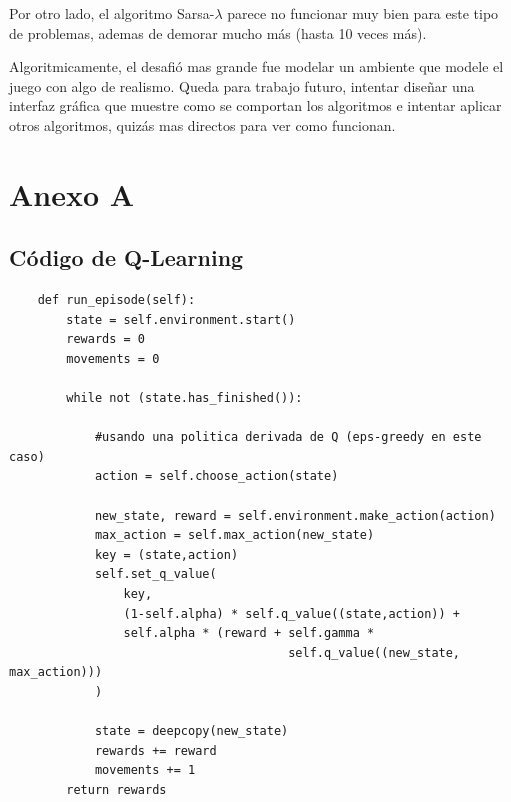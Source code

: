 \documentclass[11pt, a4paper]{article}
\newcommand{\slambda}{Sarsa-$\lambda$ }
\begin{document}
Por otro lado, el algoritmo \slambda parece no funcionar muy bien para este tipo de problemas, ademas de demorar mucho m\'as (hasta 10 veces m\'as). 

Algoritmicamente, el desafi\'o mas grande fue modelar un ambiente que modele el juego con algo de realismo. Queda para trabajo futuro, intentar diseñar una interfaz gr\'afica que muestre como se comportan los algoritmos e intentar aplicar otros algoritmos, quiz\'as mas directos para ver como funcionan. 



\newpage

\section{Anexo A}
\subsection{Código de Q-Learning}
\begin{verbatim}
    def run_episode(self):
        state = self.environment.start()
        rewards = 0
        movements = 0
        
        while not (state.has_finished()):
            
            #usando una politica derivada de Q (eps-greedy en este caso)
            action = self.choose_action(state)
            
            new_state, reward = self.environment.make_action(action)
            max_action = self.max_action(new_state)
            key = (state,action)
            self.set_q_value(
                key, 
                (1-self.alpha) * self.q_value((state,action)) + 
                self.alpha * (reward + self.gamma * 
                                       self.q_value((new_state, max_action)))
            )
            
            state = deepcopy(new_state)
            rewards += reward
            movements += 1
        return rewards
\end{verbatim}
\end{document}
